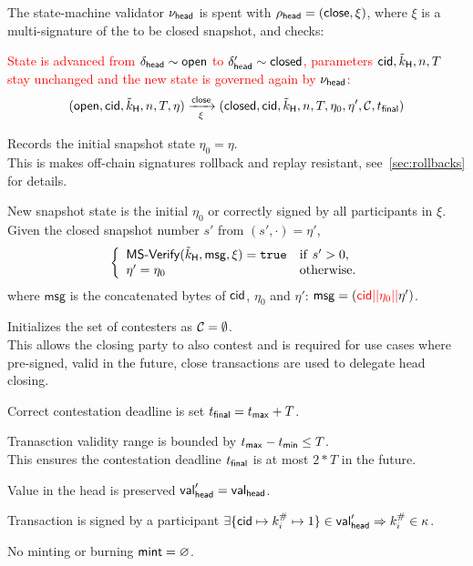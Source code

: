 \begin{samepage}
	\noindent The state-machine validator $\nu_\mathsf{head}$ is spent with
	$\rho_{\mathsf{head}} = (\mathsf{close}, \xi)$, where $\xi$ is a multi-signature of
	the to be closed snapshot, and checks:
	\begin{menumerate}
		\item \textcolor{red}{State is advanced from $\delta_{\mathsf{head}} \sim \mathsf{open}$ to $\delta_{\mathsf{head}}' \sim \mathsf{closed}$, parameters $\mathsf{cid},\tilde{k}_{\mathsf{H}},n,T$ stay unchanged and the new state is governed again by $\nu_\mathsf{head}$:}
		\[
			(\mathsf{open},\mathsf{cid},\tilde{k}_{\mathsf{H}},n,T,\eta) \xrightarrow[\xi]{\mathsf{close}} (\mathsf{closed},\mathsf{cid},\tilde{k}_{\mathsf{H}},n,T,\eta_0,\eta',\mathcal{C},t_{\mathsf{final}})
		\]
		\item Records the initial snapshot state $\eta_0 = \eta$. \\
		This is makes off-chain signatures rollback and replay resistant,
		see~\ref{sec:rollbacks} for details.
		\item New snapshot state is the initial $\eta_{0}$
		or correctly signed by all participants in $\xi$. \\
		Given the closed snapshot number $s'$ from $(s', \cdot) = \eta'$,
		\[
			\left\{\begin{array}{ll}
				\mathsf{MS\textsf{-}{}Verify}(\tilde{k}_{\mathsf{H}},\mathsf{msg},\xi) = \mathtt{true} & \mathrm{if} ~ s' > 0, \\
				\eta' = \eta_{0}                               & \mathrm{otherwise.}
			\end{array}\right.
		\]
		where $\mathsf{msg}$ is the concatenated bytes of $\mathsf{cid}$, $\eta_{0}$
		and $\eta'$: $\mathsf{msg} = (\textcolor{red}{\mathsf{cid} || \eta_{0} ||} \eta')$.
		\item Initializes the set of contesters as $\mathcal{C} = \emptyset$. \\
		This allows the closing party to also contest and is required for use
		cases where pre-signed, valid in the future, close transactions are
		used to delegate head closing.

		\item Correct contestation deadline is set $t_{\mathsf{final}} = t_{\mathsf{max}} + T$.
		\item Tranasction validity range is bounded by
		$t_{\mathsf{max}} - t_{\mathsf{min}} \leq T$. \\
		This ensures the contestation deadline $t_{\mathsf{final}}$ is at most $2*T$ in the future.
		\item Value in the head is preserved $\mathsf{val}_{\mathsf{head}}' = \mathsf{val}_{\mathsf{head}}$.
		\item Transaction is signed by a participant $\exists \{\mathsf{cid} \mapsto k^{\#}_{i} \mapsto 1\} \in \mathsf{val}_{\mathsf{head}}' \Rightarrow k^{\#}_{i} \in \kappa$.
		\item No minting or burning $\mathsf{mint} = \varnothing$.
	\end{menumerate}
\end{samepage}

